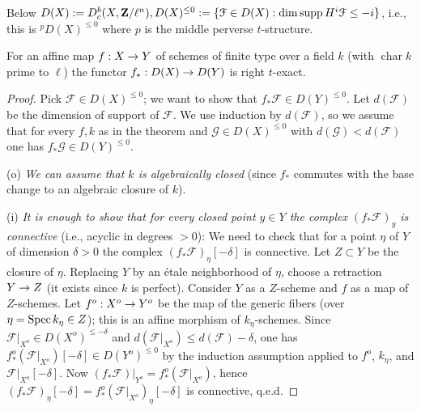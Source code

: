 \documentclass[deligne.tex]{subfiles}
\begin{document}
Below $D(X):=D^b_c(X,\mathbf{Z}/\ell^n),D(X)^{\leq0}:=\{\mathcal F\in D(X):\dim\operatorname{supp} H^i\mathcal F\leq-i\}$, i.e., this is $^pD(X)^{\leq0}$ where
$p$ is the middle perverse $t$-structure.
\begin{theorem*}[Artin]
For an affine map $f:X\rightarrow Y$ of schemes of finite type over a field $k$
(with $\operatorname{char} k$ prime to $\ell$) the functor
$f_*:D(X)\rightarrow D(Y)$ is right $t$-exact.
\end{theorem*}
\begin{proof}
Pick $\mathcal F\in D(X)^{\leq0}$; we want to show that
$f_*\mathcal F\in D(Y)^{\leq0}$. Let $d(\mathcal F)$ be the dimension of
support of $\mathcal F$. We use induction by $d(\mathcal F)$, so we assume
that for every $f,k$ as in the theorem and $\mathcal G\in D(X)^{\leq0}$
with $d(\mathcal G)<d(\mathcal F)$ one has $f_*\mathcal G\in D(Y)^{\leq0}$.

(o) \emph{We can assume that $k$ is algebraically closed} (since $f_*$
commutes with the base change to an algebraic closure of $k$).

(i) \emph{It is enough to show that for every closed point $y\in Y$ the
complex $(f_*\mathcal F)_y$ is connective} (i.e., acyclic in degrees $>0$):
We need to check that for a point $\eta$ of $Y$ of dimension $\delta>0$
the complex $(f_*\mathcal F)_\eta[-\delta]$ is connective. Let $Z\subset Y$
be the closure of $\eta$. Replacing $Y$ by an étale neighborhood of $\eta$,
choose a retraction $Y\rightarrow Z$ (it exists since $k$ is perfect). Consider
$Y$ as a $Z$-scheme and $f$ as a map of $Z$-schemes. Let $f^o:X^o\rightarrow Y^o$
be the map of the generic fibers (over $\eta=\operatorname{Spec} k_\eta\in Z$); this is
an affine morphism of $k_\eta$-schemes.
Since $\mathcal F|_{X^o}\in D(X^o)^{\leq-\delta}$ and
$d(\mathcal F|_{X^o})\leq d(\mathcal F)-\delta$, one has
$f^o_*(\mathcal F|_{X^o})[-\delta]\in D(Y^o)^{\leq0}$ by the induction
assumption applied to $f^o$, $k_\eta$, and $\mathcal F|_{X^o}[-\delta]$.
Now $(f_*\mathcal F)|_{Y^o}=f_*^o(\mathcal F|_{X^o})$, hence
$(f_*\mathcal F)_\eta[-\delta]=f_*^o(\mathcal F|_{X^o})_\eta[-\delta]$
is connective, q.e.d.


\end{proof}
\end{document}
